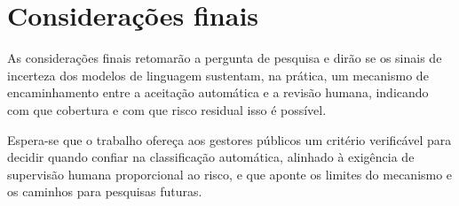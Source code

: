 
\section{Considerações finais}

As considerações finais retomarão a pergunta de pesquisa e dirão se os sinais
de incerteza dos modelos de linguagem sustentam, na prática, um mecanismo de
encaminhamento entre a aceitação automática e a revisão humana, indicando com
que cobertura e com que risco residual isso é possível.

Espera-se que o trabalho ofereça aos gestores públicos um critério verificável
para decidir quando confiar na classificação automática, alinhado à exigência
de supervisão humana proporcional ao risco, e que aponte os limites do
mecanismo e os caminhos para pesquisas futuras.

